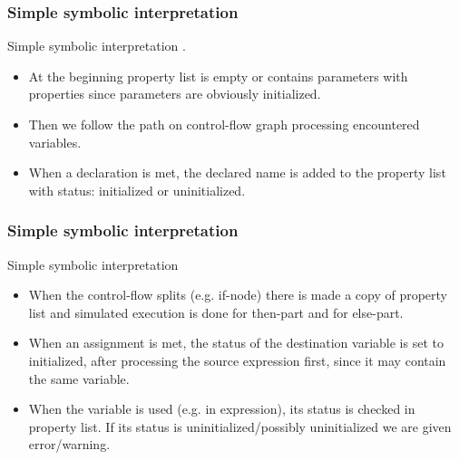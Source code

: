 \documentclass[presentation]{beamer}
\begin{document}
\begin{frame}
  \frametitle{Simple symbolic interpretation}
  
  \begin{block}{Simple symbolic interpretation}
  . 
  \begin{itemize}
    \item At the beginning property list is empty or contains parameters with properties since parameters are obviously initialized.
    \item Then we follow the path on control-flow graph processing encountered variables.
    \item When a declaration is met, the declared name is added to the property list with status: initialized or uninitialized.
    
    \end{itemize}
 
  \end{block}
  
\end{frame}

\begin{frame}
  \frametitle{Simple symbolic interpretation}
  
  \begin{block}{Simple symbolic interpretation}
  \begin{itemize}
    \item When the control-flow splits (e.g. if-node) there is made a copy of property list and simulated execution is done for then-part and for else-part.
    \item When an assignment is met, the status of the destination variable is set to
    initialized, after processing the source expression first, since it may contain the same
    variable.
    \item When the variable is used (e.g. in expression), its status is checked in property list. If its status is uninitialized/possibly uninitialized we are given error/warning.
    \end{itemize}
 
  \end{block}
  
\end{frame}
\end{document}
